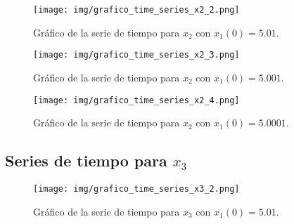 
\begin{figure}[!h] %
\begin{center}
\texttt{[image: img/grafico\_time\_series\_x2\_2.png]} %
\caption{\label{fig:fig_ts_x2_iv2}\footnotesize{Gráfico de la serie de tiempo para $x_{2}$ con $x_{1}(0) = 5.01$.}}
\end{center}
\end{figure}


\begin{figure}[!h] %
\begin{center}
\texttt{[image: img/grafico\_time\_series\_x2\_3.png]} %
\caption{\label{fig:fig_ts_x2_iv3}\footnotesize{Gráfico de la serie de tiempo para $x_{2}$ con $x_{1}(0) = 5.001$.}}
\end{center}
\end{figure}


\begin{figure}[!h] %
\begin{center}
\texttt{[image: img/grafico\_time\_series\_x2\_4.png]} %
\caption{\label{fig:fig_ts_x2_iv4}\footnotesize{Gráfico de la serie de tiempo para $x_{2}$ con $x_{1}(0) = 5.0001$.}}
\end{center}
\end{figure}

\clearpage



\subsection{Series de tiempo para $x_{3}$}


\begin{figure}[!h] %
\begin{center}
\texttt{[image: img/grafico\_time\_series\_x3\_2.png]} %
\caption{\label{fig:fig_ts_x3_iv2}\footnotesize{Gráfico de la serie de tiempo para $x_{3}$ con $x_{1}(0) = 5.01$.}}
\end{center}
\end{figure}

